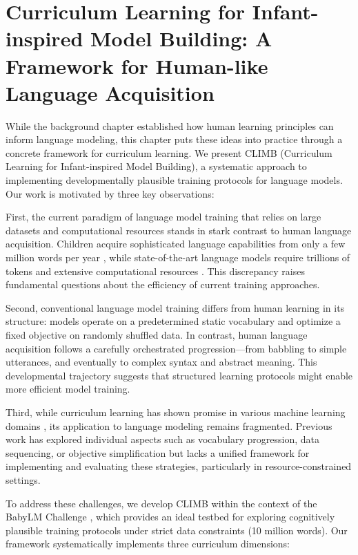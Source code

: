 \chapter{Curriculum Learning for Infant-inspired Model Building: A Framework for Human-like Language Acquisition}
\label{chapter:CLIMB}

While the background chapter established how human learning principles can inform language modeling, this chapter puts these ideas into practice through a concrete framework for curriculum learning. We present CLIMB (Curriculum Learning for Infant-inspired Model Building), a systematic approach to implementing developmentally plausible training protocols for language models. Our work is motivated by three key observations:

First, the current paradigm of language model training that relies on large datasets and computational resources stands in stark contrast to human language acquisition. Children acquire sophisticated language capabilities from only a few million words per year \citep{gilkerson2017mapping}, while state-of-the-art language models require trillions of tokens and extensive computational resources \citep{zhang2021need, zhao2023llmsurvey}. This discrepancy raises fundamental questions about the efficiency of current training approaches.

Second, conventional language model training differs from human learning in its structure: models operate on a predetermined static vocabulary and optimize a fixed objective on randomly shuffled data. In contrast, human language acquisition follows a carefully orchestrated progression—from babbling to simple utterances, and eventually to complex syntax and abstract meaning. This developmental trajectory suggests that structured learning protocols might enable more efficient model training.

Third, while curriculum learning has shown promise in various machine learning domains \citep{bengio2009curriculum}, its application to language modeling remains fragmented. Previous work has explored individual aspects such as vocabulary progression, data sequencing, or objective simplification but lacks a unified framework for implementing and evaluating these strategies, particularly in resource-constrained settings.

To address these challenges, we develop CLIMB within the context of the BabyLM Challenge \citep{warstadt2023babylm1}, which provides an ideal testbed for exploring cognitively plausible training protocols under strict data constraints (10 million words). Our framework systematically implements three curriculum dimensions:

